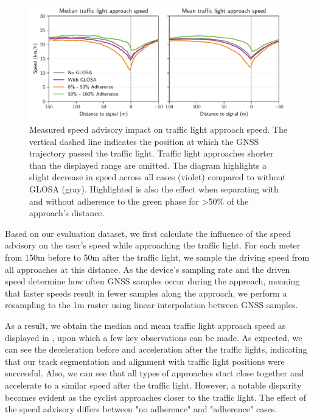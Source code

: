 \begin{figure}[t]
\caption{Measured speed advisory impact on traffic light approach speed. The vertical dashed line indicates the position at which the GNSS trajectory passed the traffic light. Traffic light approaches shorter than the displayed range are omitted. The diagram highlights a slight decrease in speed across all cases (violet) compared to without GLOSA (gray). Highlighted is also the effect when separating with and without adherence to the green phase for >50\% of the approach's distance.}\label{fig:impacts-approach-speed}
\includegraphics[width=\linewidth]{images/impacts-approach-speed.pdf}
\end{figure}

Based on our evaluation dataset, we first calculate the influence of the speed advisory on the user's speed while approaching the traffic light. For each meter from 150m before to 50m after the traffic light, we sample the driving speed from all approaches at this distance. As the device's sampling rate and the driven speed determine how often GNSS samples occur during the approach, meaning that faster speeds result in fewer samples along the approach, we perform a resampling to the 1m raster using linear interpolation between GNSS samples.

As a result, we obtain the median and mean traffic light approach speed as displayed in , upon which a few key observations can be made. As expected, we can see the deceleration before and acceleration after the traffic lights, indicating that our track segmentation and alignment with traffic light positions were successful. Also, we can see that all types of approaches start close together and accelerate to a similar speed after the traffic light. However, a notable disparity becomes evident as the cyclist approaches closer to the traffic light. The effect of the speed advisory differs between "no adherence" and "adherence" cases.

